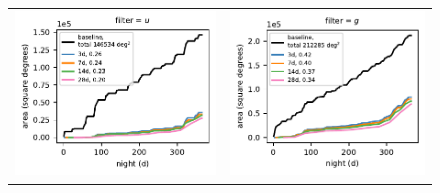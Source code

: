\documentclass[preprintm,linenumbers]{aastex631}
\begin{document}
    \begin{figure}
			\centering
						\begin{tabular}{@{}c@{}c@{}}
				\includegraphics{results/first_year_one_snap_v4_0_10yrs_db_noDD_noTwi_cum_baseline_u.pdf} &
				\includegraphics{results/first_year_one_snap_v4_0_10yrs_db_noDD_noTwi_cum_baseline_g.pdf} \\

\end{tabular}
\end{figure}
\end{document}
